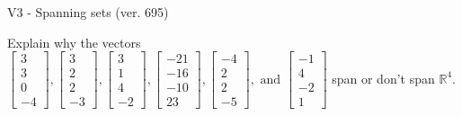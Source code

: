\begin{exercise}
  \begin{exerciseTitle}V3 - Spanning sets (ver. 695)\end{exerciseTitle}
  \begin{exerciseStatement}
    Explain why the vectors \(\left[\begin{array}{r}
3 \\
3 \\
0 \\
-4
\end{array}\right] , \left[\begin{array}{r}
3 \\
2 \\
2 \\
-3
\end{array}\right] , \left[\begin{array}{r}
3 \\
1 \\
4 \\
-2
\end{array}\right] , \left[\begin{array}{r}
-21 \\
-16 \\
-10 \\
23
\end{array}\right] , \left[\begin{array}{r}
-4 \\
2 \\
2 \\
-5
\end{array}\right] , \text{ and } \left[\begin{array}{r}
-1 \\
4 \\
-2 \\
1
\end{array}\right]\) span or don't span \(\mathbb{R}^4\). 
	



\end{exerciseStatement}
\end{exercise}
